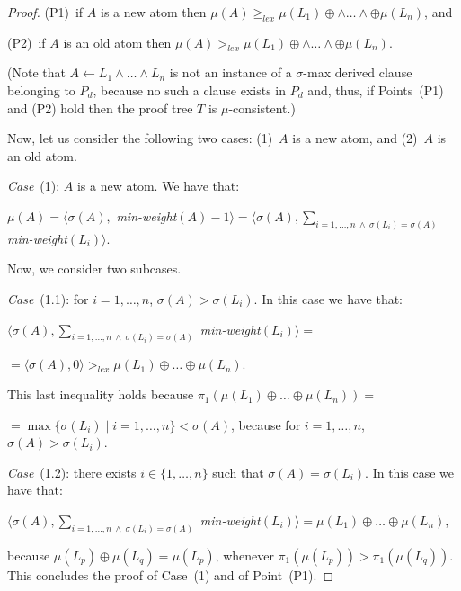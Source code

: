 \documentclass[english]{tlp}
\renewcommand{\mathit}{\displaystyle}
\begin{document}
\begin{proof}
\noindent  (P1)~if $A$ is a new atom then $\mu(A)\!\geq_{\mathit {lex}}\!
 \mu(L_1)\oplus\wedge\ldots\wedge\oplus  \mu(L_n)$, and 

\noindent 
 (P2)~if $A$ is an old atom then $\mu(A)\!>_{\mathit {lex}}\!
 \mu(L_1)\oplus\wedge\ldots\wedge\oplus  \mu(L_n)$.
 
(Note that $A\leftarrow L_1\wedge\ldots\wedge L_n$ is not an instance of a
$\sigma$-max derived clause belonging to $P_d$, because no such a clause exists in $P_d$
and, thus, if Points~(P1) and (P2) hold then the proof tree $T$ is $\mu$-consistent.)

Now, let us consider the following two cases: (1)~$A$ is a new atom, and 
(2)~$A$ is an old atom.

\medskip
{\it{Case}}~(1): $A$ is a new atom. We have that:

\smallskip

\noindent 
$\mu(A)=\langle\sigma(A),$ {\it min-weight}$(A)\!-\!1\rangle =
\langle\sigma(A),\sum_{i=1,\ldots,n \ \wedge \ \sigma(L_i)=\sigma(A)}$ {\it min-weight}$(L_i)\rangle$. 
\smallskip


Now, we consider two subcases.

\noindent
{\it{Case}}~(1.1): for $i=1,\ldots,n$,  $\sigma(A)\!>\!\sigma(L_i)$.
In this case we have that: 

\smallskip

$\langle\sigma(A),\sum_{i=1,\ldots,n \ \wedge \ \sigma(L_i)=\sigma(A)}$ {\it min-weight}$(L_i)\rangle = $  

\smallskip

$=\langle\sigma(A),0\rangle>_{\mathit{lex}} \mu(L_1)\oplus\ldots\oplus \mu(L_n)$.

\smallskip
\noindent
This last  inequality holds because $\pi_1(\mu(L_1)\oplus\ldots\oplus \mu(L_n))=$

\noindent
$=\max\{\sigma(L_i)\mid i=1,\ldots,n\}<\sigma(A)$, because
for $i=1,\ldots,n$,  $\sigma(A)\!>\!\sigma(L_i)$.

\noindent
{\it{Case}}~(1.2): there exists $i\in\{1,\ldots,n\}$ such that $\sigma(A)\!=\!\sigma(L_i)$. In this case we have that:

\smallskip

$\langle\sigma(A),\sum_{i=1,\ldots,n \ \wedge \ \sigma(L_i)=\sigma(A)}$ {\it min-weight}$(L_i)\rangle =  \mu(L_1)\oplus\ldots\oplus \mu(L_n)$,
\smallskip

\noindent
because $\mu(L_p)\oplus\mu(L_q)\!=\!\mu(L_p)$, whenever 
$\pi_1(\mu(L_p))\!>\!\pi_1(\mu(L_q))$.
This concludes the proof of Case~(1) and of Point~(P1).


\end{proof}
\end{document}
